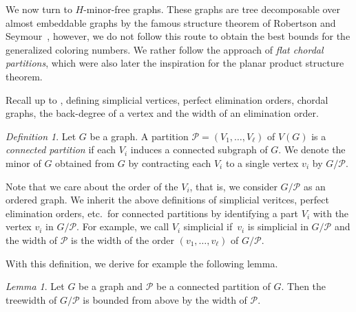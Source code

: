\documentclass[1p,number,a4paper]{elsarticle}
\theoremstyle{remark}
\newcommand{\Pp}{\mathcal{P}}
\newtheorem{definition}[theorem]{Definition}
\newtheorem{lemma}[theorem]{Lemma}
\begin{document}
We now turn to $H$-minor-free graphs. 
These graphs are tree decomposable over almost embeddable graphs by the famous structure theorem of Robertson and Seymour~\cite{robertson2003graph}, however, we do not follow this route to obtain the best bounds for the generalized coloring numbers. 
We rather follow the approach of \emph{flat chordal partitions}, which were also later the inspiration for the planar product structure theorem. 

Recall  up to , defining 
simplicial vertices, perfect elimination orders, chordal graphs, the back-degree of a vertex and the width of an elimination order. 

\begin{definition}
  Let $G$ be a graph. A partition $\mathcal{P}=(V_1,\ldots, V_\ell)$ of $V(G)$ is a \emph{connected partition} if each $V_i$ induces a connected subgraph of $G$. 
  We denote the minor of $G$ obtained from $G$ by contracting each
  $V_i$ to a single vertex $v_i$ by $G/\mathcal{P}$. 
\end{definition}

Note that we care about the order of the $V_i$, that is, we consider $G/\Pp$ as an ordered graph. 
We inherit the above definitions of simplicial veritces, perfect elimination orders, etc.\ for connected partitions by identifying a part $V_i$ with the vertex $v_i$ in $G/\Pp$. 
For example, we call $V_i$ simplicial if~$v_i$ is simplicial in $G/\Pp$ and the width of $\Pp$ is the width of the order $(v_1,\ldots, v_\ell)$ of $G/\Pp$. 


With this definition, we derive for example the following lemma. 

\begin{lemma}
  Let $G$ be a graph and $\Pp$ be a connected partition of $G$. Then the treewidth of $G/\Pp$ is bounded from above by the width of $\Pp$. 
\end{lemma}
\end{document}
